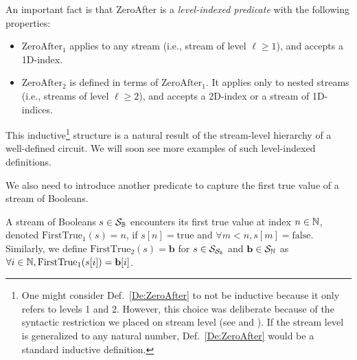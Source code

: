 An important fact is that ZeroAfter is a \emph{level-indexed predicate} with the following properties:
\begin{itemize}
    \item $\text{ZeroAfter}_1$ applies to any stream (i.e., stream of level $\ell \ge 1$), and accepts a 1D-index.
    \item $\text{ZeroAfter}_2$ is defined in terms of $\text{ZeroAfter}_1$. It applies only to nested streams (i.e., streams of level $\ell \ge 2$), and accepts a 2D-index or a stream of 1D-indices.
\end{itemize}
This inductive\footnote{
    One might consider Def.~\ref{De:ZeroAfter} to not be inductive because it only refers to levels 1 and 2.
    However, this choice was deliberate because of the syntactic restriction we placed on stream level (see  and ). If the stream level is generalized to any natural number, Def.~\ref{De:ZeroAfter} would be a standard inductive definition.
} structure is a natural result of the stream-level hierarchy of a well-defined circuit.     We will soon see more examples of such level-indexed definitions. 

We also need to introduce another predicate to capture the first true value of a stream of Booleans.
\begin{definition}[FirstTrue]
    A stream of Booleans $s \in \mathcal{S}_{\mathbb{B}}$ encounters its first true value at index $n \in \mathbb{N}$, denoted $\text{FirstTrue}_1(s) = n$, if $s[n]= \text{true}$ and $\forall m < n, s[m] = \text{false}$. Similarly, we define $\text{FirstTrue}_2(s) = \mathbf b$ for $s \in \mathcal{S}_{\mathcal{S}_{\mathbb{B}}}$ and $\mathbf b \in \mathcal{S}_{\mathbb{N}}$ as $\forall i \in \mathbb{N}, \text{FirstTrue}_1(s[i]) = \mathbf b[i]$.
\end{definition}

